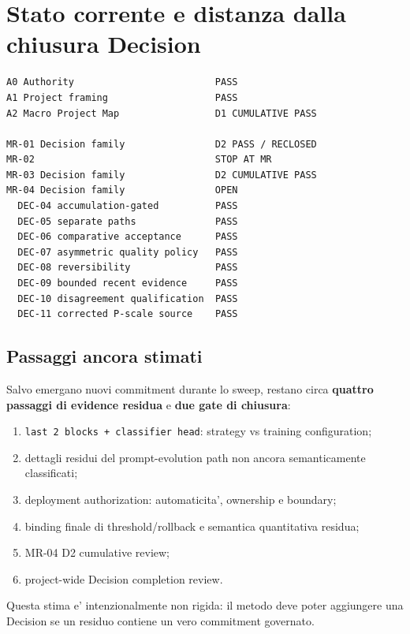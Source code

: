 \documentclass[11pt,a4paper]{article}
\begin{document}
\tableofcontents
\clearpage

\section{Stato corrente e distanza dalla chiusura Decision}
\begin{ddtacore}[title={Decision completion snapshot}]
\begin{lstlisting}
A0 Authority                         PASS
A1 Project framing                   PASS
A2 Macro Project Map                 D1 CUMULATIVE PASS

MR-01 Decision family                D2 PASS / RECLOSED
MR-02                                STOP AT MR
MR-03 Decision family                D2 CUMULATIVE PASS
MR-04 Decision family                OPEN
  DEC-04 accumulation-gated          PASS
  DEC-05 separate paths              PASS
  DEC-06 comparative acceptance      PASS
  DEC-07 asymmetric quality policy   PASS
  DEC-08 reversibility               PASS
  DEC-09 bounded recent evidence     PASS
  DEC-10 disagreement qualification  PASS
  DEC-11 corrected P-scale source    PASS
\end{lstlisting}
\end{ddtacore}

\subsection{Passaggi ancora stimati}
Salvo emergano nuovi commitment durante lo sweep, restano circa \textbf{quattro passaggi di evidence residua} e \textbf{due gate di chiusura}:
\begin{enumerate}
  \item \texttt{last 2 blocks + classifier head}: strategy vs training configuration;
  \item dettagli residui del prompt-evolution path non ancora semanticamente classificati;
  \item deployment authorization: automaticita', ownership e boundary;
  \item binding finale di threshold/rollback e semantica quantitativa residua;
  \item MR-04 D2 cumulative review;
  \item project-wide Decision completion review.
\end{enumerate}
Questa stima e' intenzionalmente non rigida: il metodo deve poter aggiungere una Decision se un residuo contiene un vero commitment governato.
\end{document}
